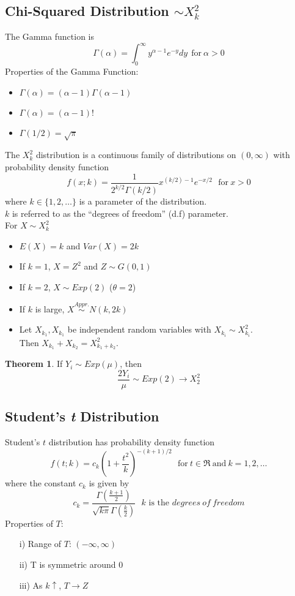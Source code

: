 \documentclass[12pt]{article}
\theoremstyle{definition}
\newtheorem*{theorem}{Theorem}
\begin{document}
  \subsection{Chi-Squared Distribution $\sim X_{k}^{2}$}
  The Gamma function is
  $$\Gamma(\alpha) = \int_{0}^{\infty}y^{\alpha -1}e^{-y}dy ~~\text{for}~\alpha > 0$$
  Properties of the Gamma Function:
  \begin{itemize}
    \item $\Gamma(\alpha) = (\alpha - 1)\Gamma(\alpha - 1)$
    \item $\Gamma(\alpha) = (\alpha - 1)!$
    \item $\Gamma(1/2) = \sqrt{\pi}$
  \end{itemize}
  The $X_{k}^{2}$ distribution is a continuous family of distributions on $(0, \infty)$ with probability density function
  $$f(x;k) = \frac{1}{2^{k/2}\Gamma(k/2)}x^{(k/2)-1}e^{-x/2}~~~\text{for}~x > 0$$
  where $k \in \{1, 2, \dots\}$ is a parameter of the distribution. \\
  $k$ is referred to as the ``degrees of freedom'' (d.f) parameter. \\

  For $X \sim X_{k}^{2}$
  \begin{itemize}
    \item $E(X) = k$ and $Var(X) = 2k$
    \item If $k = 1$, $X = Z^{2}$ and $Z \sim G(0,1)$
    \item If $k = 2$, $X \sim Exp(2)$ ($\theta = 2$)
    \item If $k$ is large, $X \stackrel{Appr.}{\sim} N(k, 2k)$
    \item Let $X_{k_{1}}, X_{k_{1}}$ be independent random variables with $X_{k_{i}} \sim X_{k_{i}}^{2}$. \\
    Then $X_{k_{1}} + X_{k_{2}} =  X_{k_{1} + k_{2}}^{2}$.
  \end{itemize}

  \begin{theorem}
    If $Y_{i} \sim Exp(\mu)$, then
    $$\frac{2Y_{i}}{\mu} \sim Exp(2) \rightarrow X_{2}^{2}$$
  \end{theorem}

  \subsection{Student's \emph{t} Distribution}
  Student's $t$ distribution has probability density function
  $$
  f(t;k) = c_{k}\left(1 + \frac{t^{2}}{k}\right)^{-(k+1)/2}
  ~~~\text{for}~t \in \Re~\text{and}~ k = 1, 2, \dots
  $$
  where the constant $c_{k}$ is given by
  $$
  c_{k} = \frac{\Gamma(\frac{k+1}{2})}{\sqrt{k\pi}\Gamma(\frac{k}{2})}
  ~~~k\text{ is the }degrees~of~freedom
  $$
  Properties of $T$:
  \begin{itemize}
    \item[i)] Range of $T$: $(-\infty, \infty)$
    \item[ii)] T is symmetric around 0
    \item[iii)] As $k \uparrow$, $T \rightarrow Z$
  \end{itemize}
\end{document}

